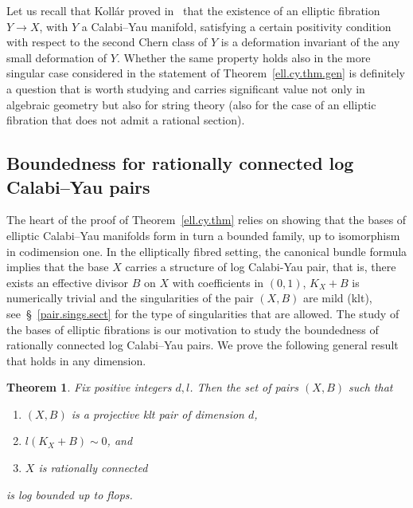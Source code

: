 \documentclass[11pt]{ip-journal}
\newtheorem{theorem}{Theorem}[section]
\theoremstyle{definition}
\begin{document}
Let us recall that Koll\'ar proved 
in~\cite{koll.elliptic}
that the existence of an elliptic fibration
$Y \to X$,
with 
$Y$ 
a Calabi--Yau manifold, 
satisfying a certain positivity condition with respect to the second Chern class of 
$Y$ 
is a deformation invariant of the any small deformation of $Y$.
Whether the same property holds also in the more singular case considered in the statement of
Theorem~\ref{ell.cy.thm.gen} is definitely a question that is worth studying and carries significant value not only in algebraic geometry but also for string theory (also for the case of an elliptic fibration that does not admit a rational section).

\subsection*{Boundedness for rationally connected log Calabi--Yau pairs}

The heart of the proof of Theorem~\ref{ell.cy.thm} relies on showing that the bases of elliptic Calabi--Yau manifolds form in turn a bounded family, up to isomorphism in codimension one. 
In the elliptically fibred setting, the canonical bundle formula implies that the base $X$ carries a structure of log Calabi-Yau pair, that is, there exists an effective divisor $B$ on $X$ with coefficients in $(0,1)$, $K_X+B$ is numerically trivial and the singularities of the pair $(X, B)$ are mild (klt), see~\S~\ref{pair.sings.sect} for the type of singularities that are allowed. 
The study of the bases of elliptic fibrations is our motivation to study the boundedness of rationally connected log Calabi--Yau pairs. 
We prove the following general result that holds in any dimension.


\begin{theorem}
\label{delta.lcy.thm}
Fix positive integers $d, l$.
Then the set of pairs $(X, B)$ such that
\begin{enumerate}
    \item $(X, B)$ is a projective klt pair of dimension $d$,
    \item $l(K_X+B) \sim 0$, and
    \item $X$ is rationally connected
\end{enumerate}
is log bounded up to flops.
\end{theorem}
\end{document}
